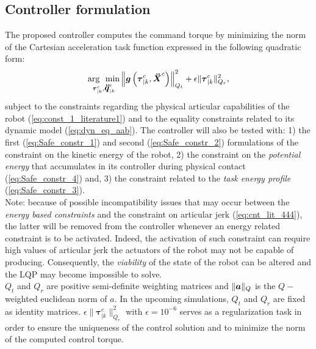 \subsection{Controller formulation}
\label{subsec:cntrl_frmulation}
The proposed controller computes the command torque by minimizing the norm of the  Cartesian acceleration task function expressed in the following quadratic form: 
\begin{equation}
\operatorname*{arg~~min} \limits_{\boldsymbol{\tau}_{|k}^{c}, \mbox{\boldmath${\ddot{q}}$}_{|k}^{c}}  \left\| \mbox{\boldmath${g}$}\left(\boldsymbol{\tau}_{|k}^{c},\mbox{\boldmath${\ddot{X}}$}^c\right) \right\|_{Q_t}^2 + \epsilon  \| \boldsymbol{\tau}_{|k}^{c} \|_{Q_r}^2,
\label{eq:ctrl_pbb}
\end{equation}
subject to the constraints regarding the physical articular capabilities of the robot (\ref{eq:const_1_literature1}) and to the equality constraints related to its dynamic model (\ref{eq:dyn_eq_aab}). The controller will also be tested with: 1) the first (\ref{eq:Safe_constr_1}) and second (\ref{eq:Safe_constr_2}) formulations of the constraint on the kinetic energy of the robot, 2) the constraint on the \textit{potential energy} that accumulates in its controller during physical contact (\ref{eq:Safe_constr_4}) and, 3) the constraint related to the \textit{task energy profile} (\ref{eq:Safe_constr_3}). \\
Note: because of possible incompatibility issues that may occur between the \textit{energy based constraints} and the constraint on articular jerk (\ref{eq:cnt_lit_444}), the latter will be removed from the controller whenever an energy related constraint is to be activated. Indeed, the activation of such constraint can require high values of articular jerk the actuators of the robot may not be capable of producing. Consequently, the \textit{viability} of the state of the robot can be altered and the LQP may become impossible to solve. \\
$Q_t$ and $Q_r$ are  positive semi-definite weighting matrices and $\| \mbox{\boldmath${a}$} \|_{Q}$ is the $Q-$weighted euclidean norm of $a$. In the upcoming simulations, $Q_t$ and $Q_r$ are fixed as identity matrices. $\epsilon  \| \boldsymbol{\tau}_{|k}^{c} \|_{Q_r}^2$ with $\epsilon = 10^{-6}$ serves as a regularization task in order to ensure the uniqueness of the control solution and to minimize the norm of the computed control torque. \\
